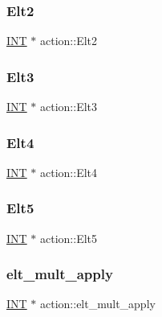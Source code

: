 \subsubsection{\texorpdfstring{Elt2}{Elt2}}
{\footnotesize\ttfamily \mbox{\hyperlink{galois_8h_a09fddde158a3a20bd2dcadb609de11dc}{I\+NT}} $\ast$ action\+::\+Elt2}

\mbox{\label{classaction_a6b75b8f407544393d91d540888a7d3ee}} 
\subsubsection{\texorpdfstring{Elt3}{Elt3}}
{\footnotesize\ttfamily \mbox{\hyperlink{galois_8h_a09fddde158a3a20bd2dcadb609de11dc}{I\+NT}} $\ast$ action\+::\+Elt3}

\mbox{\label{classaction_a88395c91571d6fbebeddf30d7091ebbe}} 
\subsubsection{\texorpdfstring{Elt4}{Elt4}}
{\footnotesize\ttfamily \mbox{\hyperlink{galois_8h_a09fddde158a3a20bd2dcadb609de11dc}{I\+NT}} $\ast$ action\+::\+Elt4}

\mbox{\label{classaction_ae372dc589508927b5f65a8bf1f7804ec}} 
\subsubsection{\texorpdfstring{Elt5}{Elt5}}
{\footnotesize\ttfamily \mbox{\hyperlink{galois_8h_a09fddde158a3a20bd2dcadb609de11dc}{I\+NT}} $\ast$ action\+::\+Elt5}

\mbox{\label{classaction_a9cf33bf107c45b51e60e00f3e49597dd}} 
\subsubsection{\texorpdfstring{elt\+\_\+mult\+\_\+apply}{elt\_mult\_apply}}
{\footnotesize\ttfamily \mbox{\hyperlink{galois_8h_a09fddde158a3a20bd2dcadb609de11dc}{I\+NT}} $\ast$ action\+::elt\+\_\+mult\+\_\+apply}

